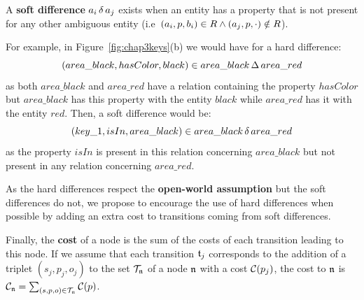 \documentclass[a4paper,11pt,twoside]{StyleThese}
\begin{document}
\begin{definition}
A \textbf{soft difference} $a_i \,\delta\, a_j$ exists when an entity has a property that is not present for any other ambiguous entity (i.e~$(a_i, p, b_i) \in R \land (a_j, p, \cdot) \notin R$).
\end{definition}

For example, in Figure~\ref{fig:chap3keys}(b) we would have for a hard difference: 
\begin{equation*}
(area\_black, hasColor, black) \in area\_black \,\Delta\, area\_red
\end{equation*}
as both $area\_black$ and $area\_red$ have a relation containing the property $hasColor$ but $area\_black$ has this property with the entity $black$ while $area\_red$ has it with the entity $red$. Then, a soft difference would be: 
\begin{equation*}
(key\_1, isIn, area\_black) \in area\_black \,\delta\, area\_red
\end{equation*}
as the property $isIn$ is present in this relation concerning $area\_black$ but not present in any relation concerning $area\_red$.

As the hard differences respect the \textbf{open-world assumption} but the soft differences do not, we propose to encourage the use of hard differences when possible by adding an extra cost to transitions coming from soft differences.

Finally, the \textbf{cost} of a node is the sum of the costs of each transition leading to this node. If we assume that each transition $\mathfrak{t}_j$ corresponds to the addition of a triplet $(s_j, p_j, o_j)$ to the set $\mathcal{T}_{\mathfrak{n}}$ of a node $\mathfrak{n}$ with a cost $\mathcal{C}(p_j)$, the cost to $\mathfrak{n}$ is $\mathcal{C}_{\mathfrak{n}} = \sum_{(s, p, o) \in \mathcal{T}_{\mathfrak{n}}} \mathcal{C}(p)$. 
\end{document}
